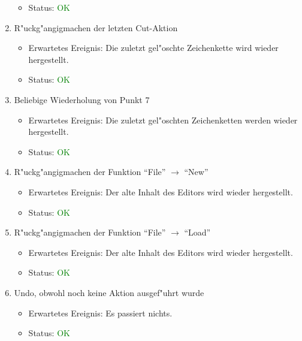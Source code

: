 \begin{enumerate}
\begin{itemize}
\item Status: \textcolor{green}{OK}
\end{itemize}
\item R"uckg"angigmachen der letzten Cut-Aktion
\begin{itemize}
\item Erwartetes Ereignis: Die zuletzt gel"oschte Zeichenkette wird wieder hergestellt. 
\item Status: \textcolor{green}{OK}
\end{itemize}
\item Beliebige Wiederholung von Punkt 7
\begin{itemize}
\item Erwartetes Ereignis: Die zuletzt gel"oschten Zeichenketten werden wieder hergestellt. 
\item Status: \textcolor{green}{OK}
\end{itemize}
\item R"uckg"angigmachen der Funktion "`File"' $\rightarrow$ "`New"'
\begin{itemize}
\item Erwartetes Ereignis: Der alte Inhalt des Editors wird wieder hergestellt. 
\item Status: \textcolor{green}{OK}
\end{itemize}
\item R"uckg"angigmachen der Funktion "`File"' $\rightarrow$ "`Load"'
\begin{itemize}
\item Erwartetes Ereignis: Der alte Inhalt des Editors wird wieder hergestellt. 
\item Status: \textcolor{green}{OK}
\end{itemize}
\item Undo, obwohl noch keine Aktion ausgef"uhrt wurde
\begin{itemize}
\item Erwartetes Ereignis: Es passiert nichts. 
\item Status: \textcolor{green}{OK}
\end{itemize}
\end{enumerate}
